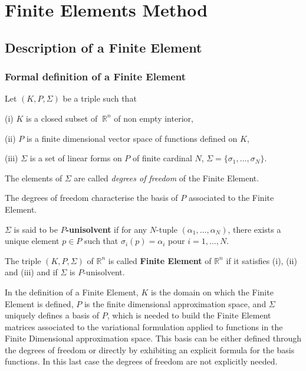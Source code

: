 \chapter{Finite Elements Method}
\section{Description of a Finite Element}

\subsection{Formal definition of a Finite Element}

Let $(K,P,\Sigma)$ be a triple such that

(i) $K$ is a closed subset of $\ \mathbb{R}^n$ of non empty interior,

(ii) $P$ is a finite dimensional vector space of functions defined on $K$,

(iii) $\Sigma$ is a set of linear forms on $P$ of finite cardinal
 $N$, $\Sigma=\{\sigma_1,\dots,\sigma_N\}$.

\begin{definition}
The elements of $\Sigma$ are called \emph{degrees of freedom} of the Finite Element.
\end{definition}
The degrees of freedom characterise the basis of $P$ associated to the Finite Element.

\begin{definition} 
  $\Sigma$ is said to be \textbf{$P$-unisolvent} if for any $N$-tuple
$(\alpha_1,\dots,\alpha_N)$, there  exists a unique element $p\in P$ such that
$\sigma_i(p)=\alpha_i$ pour $i=1,\dots, N$.
\end{definition} 
\begin{definition}
  The triple $(K,P,\Sigma)$ of $ \mathbb{R}^n$ is called \textbf{Finite Element} of $ \mathbb{R}^n$ if it satisfies
     (i), (ii) and (iii) and if $\Sigma$
  is $P$-unisolvent.
\end{definition}

In the definition of a Finite Element, $K$ is the domain on which the Finite Element is defined, $P$ is the finite dimensional approximation space, and $\Sigma$ uniquely defines a basis of $P$, which is needed to build the Finite Element matrices associated to the variational formulation applied to functions in the Finite Dimensional approximation space. This basis can be either defined through the degrees of freedom or directly by exhibiting an explicit formula for the basis functions. In this last case the degrees of freedom are not explicitly needed. 

